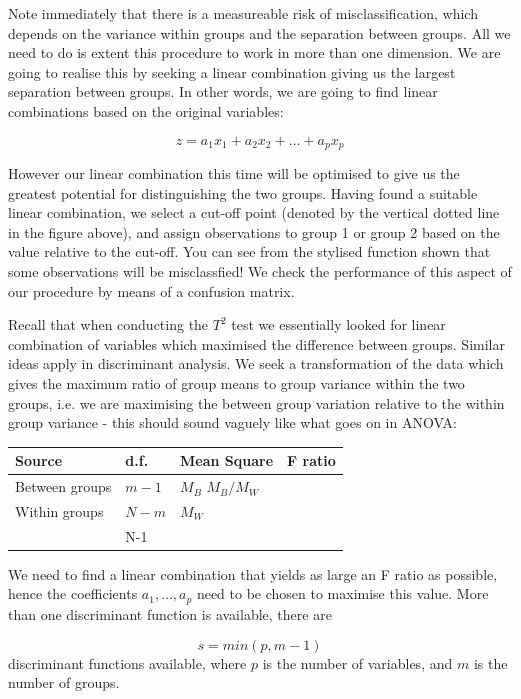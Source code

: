 Note immediately that there is a measureable risk of misclassification, which depends on the variance within groups and the separation between groups.   All we need to do is extent this procedure to work in more than one dimension.   We are going to realise this by seeking a linear combination giving us the largest separation between groups.   In other words, we are going to find linear combinations based on the original variables:

\begin{equation}
z = a_{1} x_{1} + a_{2} x_{2} + \ldots + a_{p} x_{p}
\end{equation}


However our linear combination this time will be optimised to give us the greatest potential for distinguishing the two groups.   Having found a suitable linear combination, we select a cut-off point (denoted by the vertical dotted line in the figure above), and assign observations to group 1 or group 2 based on the value relative to the cut-off.   You can see from the stylised function shown that some observations will be misclassfied!   We check the performance of this aspect of our procedure by means of a confusion matrix.


Recall that when conducting the $T^{2}$ test we essentially looked for linear combination of variables which maximised the difference between groups.   Similar ideas apply in discriminant analysis.   We seek a transformation of the data which gives the maximum ratio of group means to group variance within the two groups, i.e. we are maximising the between group variation relative to the within group variance - this should sound vaguely like what goes on in ANOVA:


\begin{tabular}{llll}
Source & d.f. & Mean Square & F ratio \\
\hline
Between groups & $m-1$ & $M_{B}$ $M_{B} / M_{W}$\\
Within groups & $N-m$ & $M_{W}$ & \\
 & N-1 & & \\
\end{tabular}

We need to find a linear combination that yields as large an F ratio as possible, hence the coefficients $a_{1}, \ldots, a_{p}$ need to be chosen to maximise this value.   More than one discriminant function is available, there are

\begin{equation}
s = min(p, m-1)
\end{equation}
discriminant functions available, where $p$ is the number of variables, and $m$ is the number of groups.

